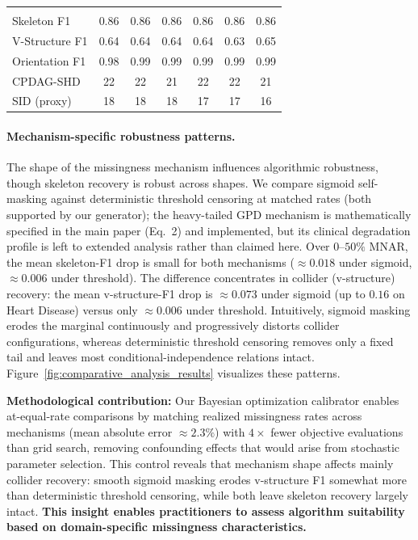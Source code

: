 \documentclass[runningheads]{llncs}
\begin{document}
\begin{table}[t]
\begin{tabular}{lcccccc}
        \addlinespace[0.3em]
        \hline
        \multicolumn{7}{l}{\textit{Hepatitis}} \\
        \quad Skeleton F1 & 0.86 & 0.86 & 0.86 & 0.86 & 0.86 & 0.86 \\
        \quad V-Structure F1 & 0.64 & 0.64 & 0.64 & 0.64 & 0.63 & 0.65 \\
        \quad Orientation F1 & 0.98 & 0.99 & 0.99 & 0.99 & 0.99 & 0.99 \\
        \quad CPDAG-SHD & 22 & 22 & 21 & 22 & 22 & 21 \\
        \quad SID (proxy) & 18 & 18 & 18 & 17 & 17 & 16 \\
        \bottomrule
    \end{tabular}
\end{table}


\paragraph{Mechanism-specific robustness patterns.}
The shape of the missingness mechanism influences algorithmic robustness, though skeleton recovery is robust across shapes. We compare sigmoid self-masking against deterministic threshold censoring at matched rates (both supported by our generator); the heavy-tailed GPD mechanism is mathematically specified in the main paper (Eq.~2) and implemented, but its clinical degradation profile is left to extended analysis rather than claimed here. Over $0$--$50\%$ MNAR, the mean skeleton-F1 drop is small for both mechanisms ($\approx0.018$ under sigmoid, $\approx0.006$ under threshold). The difference concentrates in collider (v-structure) recovery: the mean v-structure-F1 drop is $\approx0.073$ under sigmoid (up to $0.16$ on Heart Disease) versus only $\approx0.006$ under threshold. Intuitively, sigmoid masking erodes the marginal continuously and progressively distorts collider configurations, whereas deterministic threshold censoring removes only a fixed tail and leaves most conditional-independence relations intact. Figure~\ref{fig:comparative_analysis_results} visualizes these patterns.

\textbf{Methodological contribution:} Our Bayesian optimization calibrator enables at-equal-rate comparisons by matching realized missingness rates across mechanisms (mean absolute error $\approx2.3\%$) with $4\times$ fewer objective evaluations than grid search, removing confounding effects that would arise from stochastic parameter selection. This control reveals that mechanism shape affects mainly collider recovery: smooth sigmoid masking erodes v-structure F1 somewhat more than deterministic threshold censoring, while both leave skeleton recovery largely intact. \textbf{This insight enables practitioners to assess algorithm suitability based on domain-specific missingness characteristics.}
\end{document}
